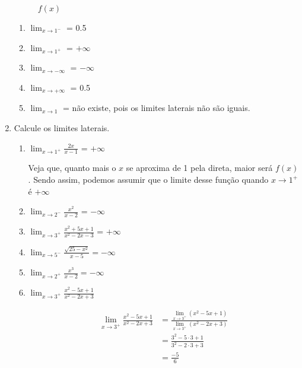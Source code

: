 \documentclass[a4paper, 12pt]{article}
\newcommand{\espaco}{\vspace{10pt}}
\begin{document}
\begin{enumerate}
\begin{figure}[htbp]
        \caption{$f(x)$}
    \end{figure}

    \begin{enumerate}
        \item $\lim_{x \to 1^{-}}$ = 0.5
        \item $\lim_{x \to 1^{+}}$ = $+\infty$
        \item $\lim_{x \to -\infty}$ = $-\infty$
        \item $\lim_{x \to +\infty}$ = 0.5
        \item $\lim_{x \to 1}$ = não existe, pois os limites laterais não são iguais.
    \end{enumerate}

    \newpage

    \item Calcule os limites laterais.
    
    \begin{enumerate}
        \item $\lim_{x \to 1^{+}} \frac{2x}{x-1}$ = $+ \infty$ 
        
        \espaco
        Veja que, quanto mais o $x$ se aproxima de 1 pela direta, maior será $f(x)$. Sendo assim, podemos assumir que o limite desse função quando $x \to 1^{+}$ é $+ \infty$
        \espaco

        \item $\lim_{x \to 2^{-}} \frac{x^2}{x-2}$ = $- \infty$
        \item $\lim_{x \to 3^{+}} \frac{x^2 + 5x + 1}{x^2 - 2x - 3}$ = $+ \infty$
        \item $\lim_{x \to 5^{-}} \frac{\sqrt{25 - x^2}}{x-5} = - \infty$
        \item $\lim_{x \to 2^+} \frac{x^3}{x-2} = - \infty$
        \item $\lim_{x \to 3^+} \frac{x^2 - 5x + 1}{x^2 -2x + 3}$
        
        \begin{align*}
            \lim_{x \to 3^+} \frac{x^2 - 5x + 1}{x^2 -2x + 3} &= \frac{\lim_{x \to 3^+}(x^2 - 5x + 1)}{\lim_{x \to 3^+}(x^2 -2x + 3)} \tag*{[l. quo.]}\\
            &= \frac{3^2 - 5 \cdot 3 + 1}{3^2 -2 \cdot 3 + 3} \tag*{[l. pol.]}\\
            &= \frac{-5}{6}
        \end{align*}


\end{enumerate}
\end{enumerate}
\end{document}
